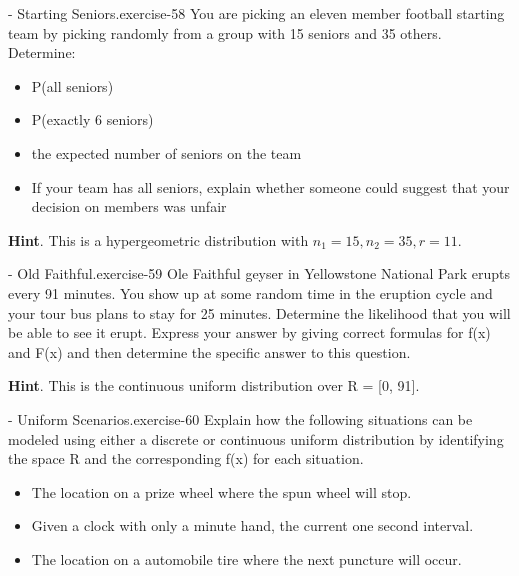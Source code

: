 \documentclass[10pt,]{book}
\numberwithin{equation}{section}
\begin{document}
%
\par
\hypertarget{p-871}{}%
\begin{inlineexercise}{- Starting Seniors.}{exercise-58}%
\hypertarget{p-872}{}%
You are picking an eleven member football starting team by picking randomly from a group with 15 seniors and 35 others. Determine: \leavevmode%
\begin{itemize}[label=\textbullet]
\item{}P(all seniors)%
\item{}P(exactly 6 seniors)%
\item{}the expected number of seniors on the team%
\item{}If your team has all seniors, explain whether someone could suggest that your decision on members was unfair%
\end{itemize}
%
\par\smallskip%
\noindent\textbf{Hint}.\hypertarget{hint-5}{}\quad%
\hypertarget{p-873}{}%
This is a hypergeometric distribution with \(n_1 = 15, n_2 = 35, r = 11\).%
\end{inlineexercise}
%
\par
\hypertarget{p-874}{}%
\begin{inlineexercise}{- Old Faithful.}{exercise-59}%
\hypertarget{p-875}{}%
Ole Faithful geyser in Yellowstone National Park erupts every 91 minutes. You show up at some random time in the eruption cycle and your tour bus plans to stay for 25 minutes. Determine the likelihood that you will be able to see it erupt.  Express your answer by giving correct formulas for f(x) and F(x) and then determine the specific answer to this question.%
\par\smallskip%
\noindent\textbf{Hint}.\hypertarget{hint-6}{}\quad%
\hypertarget{p-876}{}%
This is the continuous uniform distribution over R = [0, 91].%
\end{inlineexercise}
%
\par
\hypertarget{p-877}{}%
\begin{inlineexercise}{- Uniform Scenarios.}{exercise-60}%
\hypertarget{p-878}{}%
Explain how the following situations can be modeled using either a discrete or continuous uniform distribution by identifying the space R and the corresponding f(x) for each situation. \leavevmode%
\begin{itemize}[label=\textbullet]
\item{}The location on a prize wheel where the spun wheel will stop.%
\item{}Given a clock with only a minute hand, the current one second interval.%
\item{}The location on a automobile tire where the next puncture will occur.%
\end{itemize}
%
\end{inlineexercise}
\end{document}
